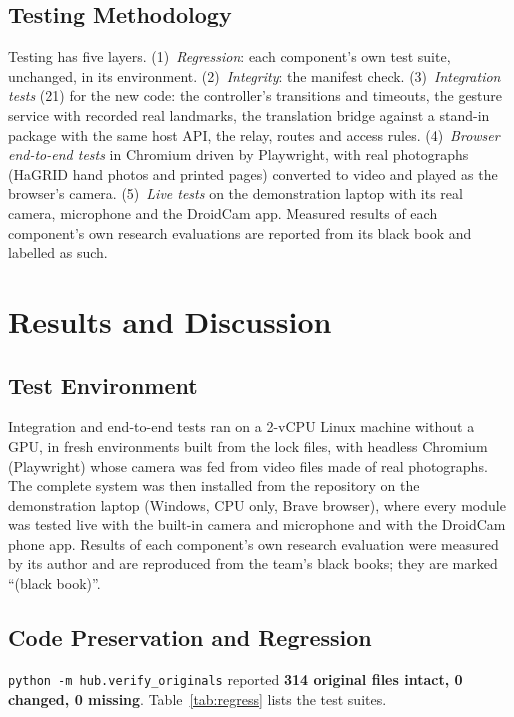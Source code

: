 \documentclass[12pt,singleside,a4paper]{article}
\begin{document}
\subsection{Testing Methodology}
Testing has five layers. (1)~\emph{Regression}: each component's own test suite, unchanged, in its environment. (2)~\emph{Integrity}: the manifest check. (3)~\emph{Integration tests} (21) for the new code: the controller's transitions and timeouts, the gesture service with recorded real landmarks, the translation bridge against a stand-in package with the same host API, the relay, routes and access rules. (4)~\emph{Browser end-to-end tests} in Chromium driven by Playwright, with real photographs (HaGRID hand photos \cite{kapitanov2024} and printed pages) converted to video and played as the browser's camera. (5)~\emph{Live tests} on the demonstration laptop with its real camera, microphone and the DroidCam app. Measured results of each component's own research evaluations are reported from its black book and labelled as such.
\section{Results and Discussion}
\subsection{Test Environment}
Integration and end-to-end tests ran on a 2-vCPU Linux machine without a GPU, in fresh environments built from the lock files, with headless Chromium (Playwright) whose camera was fed from video files made of real photographs. The complete system was then installed from the repository on the demonstration laptop (Windows, CPU only, Brave browser), where every module was tested live with the built-in camera and microphone and with the DroidCam phone app. Results of each component's own research evaluation were measured by its author and are reproduced from the team's black books; they are marked ``(black book)''.

\subsection{Code Preservation and Regression}
\texttt{python -m hub.verify\_originals} reported \textbf{314 original files intact, 0 changed, 0 missing}. Table~\ref{tab:regress} lists the test suites.
\end{document}
